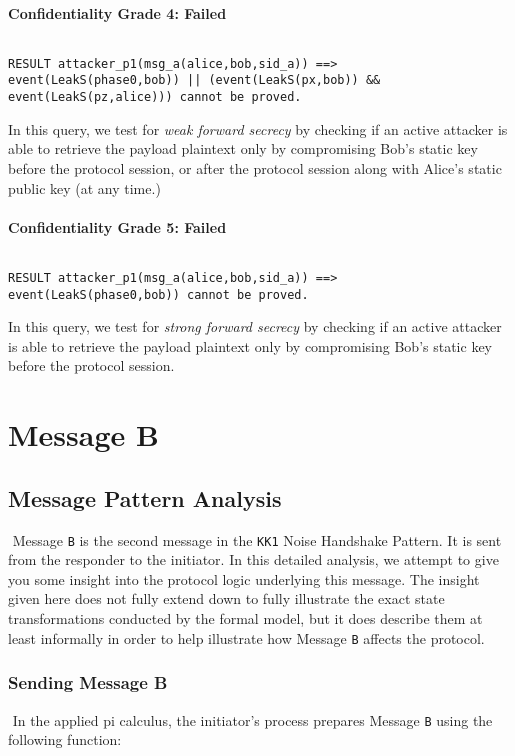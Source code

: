 \paragraph{Confidentiality Grade 4: Failed}$ $
\begin{lstlisting}
RESULT attacker_p1(msg_a(alice,bob,sid_a)) ==> event(LeakS(phase0,bob)) || (event(LeakS(px,bob)) && event(LeakS(pz,alice))) cannot be proved.
\end{lstlisting}

In this query, we test for \emph{weak forward secrecy} by checking if an active attacker is able to retrieve the payload plaintext only by compromising Bob's static key before the protocol session, or after the protocol session along with Alice's static public key (at any time.)


\paragraph{Confidentiality Grade 5: Failed}$ $
\begin{lstlisting}
RESULT attacker_p1(msg_a(alice,bob,sid_a)) ==> event(LeakS(phase0,bob)) cannot be proved.
\end{lstlisting}

In this query, we test for \emph{strong forward secrecy} by checking if an active attacker is able to retrieve the payload plaintext only by compromising Bob's static key before the protocol session.


\section{ Message B}

\subsection{Message Pattern Analysis}$ $
Message \texttt{B} is the second message in the \texttt{KK1} Noise Handshake Pattern. It is sent from the responder to the initiator. In this detailed analysis, we attempt to give you some insight into the protocol logic underlying this message. The insight given here does not fully extend down to fully illustrate the exact state transformations conducted by the formal model, but it does describe them at least informally in order to help illustrate how Message \texttt{B} affects the protocol.


\subsubsection{Sending Message B}$ $
In the applied pi calculus, the initiator's process prepares Message \texttt{B} using the following function:


